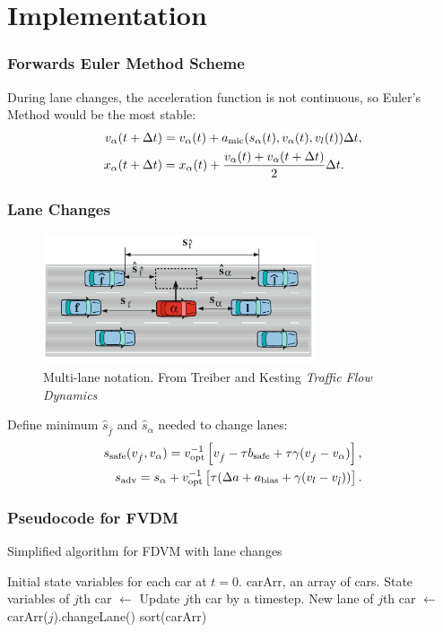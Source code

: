 \documentclass{beamer}
\begin{document}
\section{Implementation}
\begin{frame}
  \frametitle{Forwards Euler Method Scheme}
  During lane changes, the acceleration function is not continuous, so Euler's Method would be the most stable:
  \begin{align*}
    v_\alpha(t+\Delta t) &= v_\alpha(t) +a_{\rm mic}(s_\alpha(t), v_\alpha (t), v_l (t))\Delta t, \\
    x_\alpha(t + \Delta t) &= x_\alpha(t) + \frac{v_\alpha (t) + v_\alpha (t+\Delta t)}{2}\Delta t.
\end{align*}
\end{frame}

\begin{frame}
  \frametitle{Lane Changes}
  \begin{figure}[H]
    \includegraphics[width=8cm]{lane_change_diagram.PNG}
    \centering
    \caption{Multi-lane notation. From Treiber and Kesting \textit{Traffic Flow Dynamics}}
\end{figure}
  Define minimum $\hat s_{\hat f}$ and $\hat s_{\alpha}$ needed to change lanes: 
  \begin{align*}
    s_{\rm safe} (v_{\hat f}, v_{\alpha}) = v_{\rm opt}^{-1} \left[v_{\hat f} -\tau b_{\rm safe} + \tau \gamma (v_{\hat f} - v_{\alpha}) \right],\\
    s_{\rm adv} = s_{\alpha} + v_{\rm opt}^{-1} \left[\tau(\Delta a + a_{\rm bias} + \gamma(v_l - v_{\hat l}))\right].
  \end{align*}
\end{frame}

\begin{frame}
  \frametitle{Pseudocode for FVDM}
  \begin{algorithm}
    \caption{Simplified algorithm for FDVM with lane changes}\label{alg:car-following-lane}
    \begin{algorithmic}
    \Require Initial state variables for each car at $t=0$. 
    \Require carArr, an array of cars.
      \State State variables of $j$th car $\gets$ Update $j$th car by a timestep.
      \State New lane of $j$th car $\gets$ carArr($j$).changeLane()
      \EndFor
      \State sort(carArr)
    \EndFor
    \end{algorithmic}
    \end{algorithm}
\end{frame}
\end{document}
